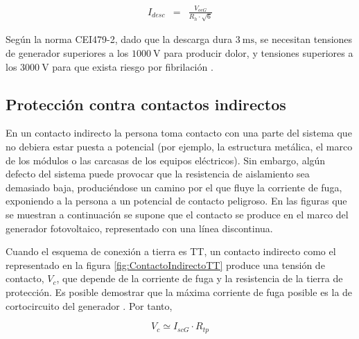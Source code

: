 \begin{eqnarray}
I_{desc} & = & \frac{V_{ocG}}{R_{h}\cdot\sqrt{6}}\label{eq:IdescIT}\end{eqnarray}

Según la norma CEI479-2, dado que la descarga dura $\SI{3}{\milli\second}$,
se necesitan tensiones de generador superiores a los $\SI{1000}{\volt}$
para producir dolor, y tensiones superiores a los $\SI{3000}{\volt}$
para que exista riesgo por fibrilación \citep{PerezGabarda2000a}.


\subsection{Protección contra contactos indirectos}

En un contacto indirecto la persona toma contacto con una parte del
sistema que no debiera estar puesta a potencial (por ejemplo, la estructura
metálica, el marco de los módulos o las carcasas de los equipos eléctricos).
Sin embargo, algún defecto del sistema puede provocar que la resistencia
de aislamiento sea demasiado baja, produciéndose un camino por el
que fluye la corriente de fuga, exponiendo a la persona a un potencial
de contacto peligroso. En las figuras que se muestran a continuación
se supone que el contacto se produce en el marco del generador fotovoltaico,
representado con una línea discontinua.

Cuando el esquema de conexión a tierra es TT, un contacto indirecto
como el representado en la figura \ref{fig:ContactoIndirectoTT} produce
una tensión de contacto, $V_{c}$,
que depende de la corriente de fuga y la resistencia de la tierra
de protección. Es posible demostrar que la máxima corriente de fuga
posible es la de cortocircuito del generador \citep{Gomez-Vidal2000}.
Por tanto, 

\begin{equation}
V_{c}\simeq I_{scG}\cdot R_{tp}\label{eq:VcIndirectoTT}\end{equation}


